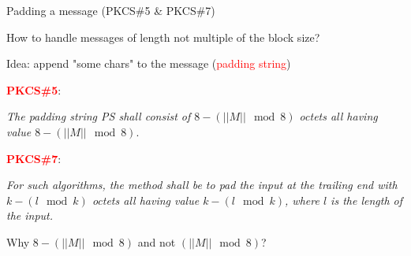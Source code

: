 \begin{frame}{Padding a message (PKCS\#5 \& PKCS\#7)}


How to handle messages of length not multiple of the block size?

\smallskip

Idea: append "some chars" to the message (\textcolor{red}{padding string})

\bigskip

\textcolor{red}{\textbf{PKCS\#5}}:

\textit{The padding string PS shall consist of $8 - (||M|| \mod 8)$ octets all having value $8 - (||M|| \mod 8).$}

\bigskip

\textcolor{red}{\textbf{PKCS\#7}}:

\textit{For such algorithms, the method shall be to pad the input at the trailing end with $k - (l \mod k)$ octets all having value $k - (l \mod k)$, where $l$ is the length of the input.}

\bigskip

Why $8 - (||M|| \mod 8)$ and not $(||M|| \mod 8)$?

\end{frame}

